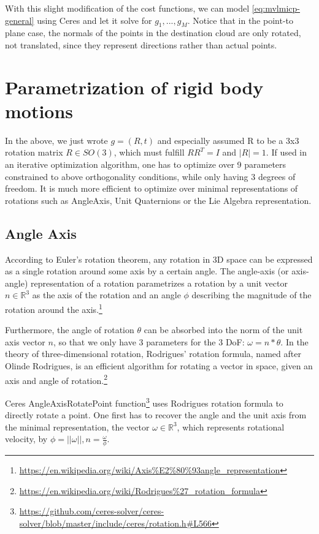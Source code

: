 \documentclass[12pt, a4paper]{article}
\begin{document}
With this slight modification of the cost functions, we can model \eqref{eq:mvlmicp-general} using Ceres and let it solve for $g_1, ..., g_M$. Notice that in the point-to plane case, the normals of the points in the destination cloud are only rotated, not translated, since they represent directions rather than actual points.


\section{Parametrization of rigid body motions}
In the above, we just wrote $g=(R,t)$ and especially assumed R to be a 3x3 rotation matrix $R \in SO(3)$, which must fulfill $RR^T=I$ and $|R|=1$. If used in an iterative optimization algorithm, one has to optimize over 9 parameters constrained to above orthogonality conditions, while only having 3 degrees of freedom. It is much more efficient to optimize over minimal representations of rotations such as AngleAxis, Unit Quaternions or the Lie Algebra representation.

\subsection{Angle Axis}
According to Euler's rotation theorem, any rotation in 3D space can be expressed as a single rotation around some axis by a certain angle. The angle-axis (or axis-angle) representation of a rotation parametrizes a rotation by a unit vector $n \in \mathbb{R}^3$ as the axis of the rotation and an angle $\phi$ describing the magnitude of the rotation around the axis.\footnote{\url{https://en.wikipedia.org/wiki/Axis\%E2\%80\%93angle_representation}}

Furthermore, the angle of rotation $\theta$ can be absorbed into the norm of the unit axis vector $n$, so that we only have 3 parameters for the 3 DoF: $\omega = n * \theta$. In the theory of three-dimensional rotation, Rodrigues' rotation formula, named after Olinde Rodrigues, is an efficient algorithm for rotating a vector in space, given an axis and angle of rotation.\footnote{\url{https://en.wikipedia.org/wiki/Rodrigues\%27_rotation_formula}}

Ceres AngleAxisRotatePoint function\footnote{\url{https://github.com/ceres-solver/ceres-solver/blob/master/include/ceres/rotation.h\#L566}} uses Rodrigues rotation formula to directly rotate a point. One first has to recover the angle and the unit axis from the minimal representation, the vector $\omega \in \mathbb{R}^3$, which represents rotational velocity, by $ \phi = ||\omega||,  n=\frac{\omega}{\phi}$.
\end{document}
